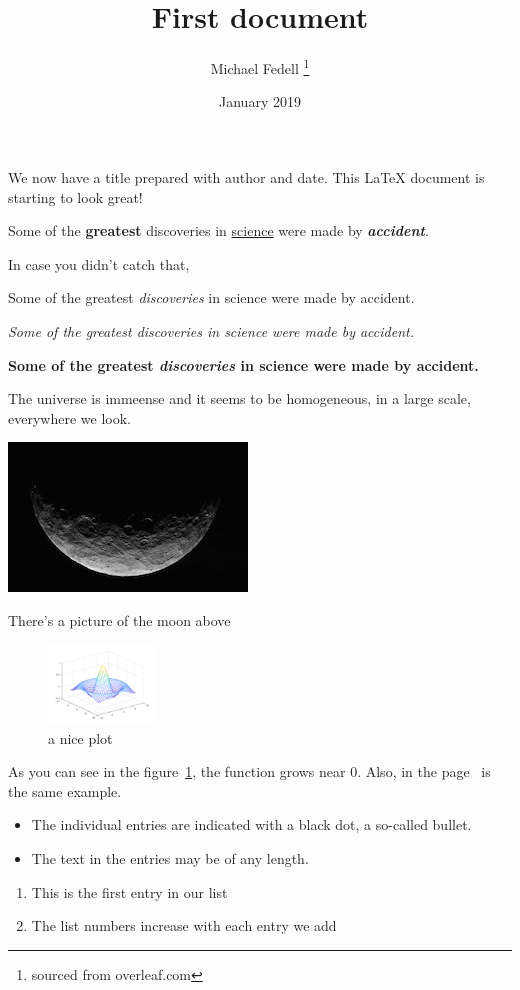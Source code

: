 \documentclass[12pt, letterpaper]{article}
\title{First document}
\author{Michael Fedell \thanks{sourced from overleaf.com}}
\date{January 2019}
\begin{document}
\maketitle
We now have a title prepared with author and date.
This \LaTeX{} document is starting to look great!

\newpage

Some of the \textbf{greatest}
discoveries in \underline{science}
were made by \textbf{\textit{accident}}.


In case you didn't catch that,

Some of the greatest \emph{discoveries}
in science
were made by accident.

\textit{Some of the greatest \emph{discoveries}
in science
were made by accident.}

\textbf{Some of the greatest \emph{discoveries}
in science
were made by accident.}

\newpage

The universe is immeense and it seems to be homogeneous, in a large scale, everywhere we look.

\includegraphics{moon}

There's a picture of the moon above

\newpage

\begin{figure}[h]
    \centering
    \includegraphics[width=0.25\textwidth]{mesh}
    \caption{a nice plot}
    \label{fig:mesh1}
\end{figure}

As you can see in the figure~\ref{fig:mesh1}, the
function grows near 0. Also, in the page~\pageref{fig:mesh1}
is the same example.

\newpage

\begin{itemize}
    \item The individual entries are indicated with a black dot, a so-called bullet.
    \item The text in the entries may be of any length.
\end{itemize}

\begin{enumerate}
    \item This is the first entry in our list
    \item The list numbers increase with each entry we add
\end{enumerate}

\newpage
\end{document}
